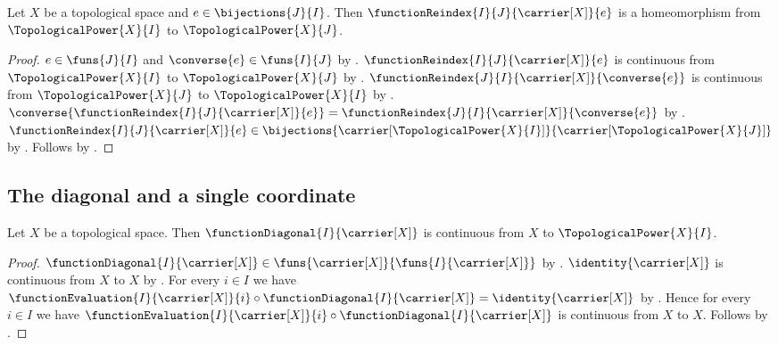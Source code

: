 \begin{theorem}\label{topological_power_reindex_homeomorphism}
    Let $X$ be a topological space and $e\in\bijections{J}{I}$.
    Then $\functionReindex{I}{J}{\carrier[X]}{e}$ is a homeomorphism from
        $\TopologicalPower{X}{I}$ to $\TopologicalPower{X}{J}$.
\end{theorem}
\begin{proof}
    $e\in\funs{J}{I}$ and $\converse{e}\in\funs{I}{J}$ by
        .
    $\functionReindex{I}{J}{\carrier[X]}{e}$ is continuous from
        $\TopologicalPower{X}{I}$ to $\TopologicalPower{X}{J}$ by
        .
    $\functionReindex{J}{I}{\carrier[X]}{\converse{e}}$ is continuous from
        $\TopologicalPower{X}{J}$ to $\TopologicalPower{X}{I}$ by
        .
    $\converse{\functionReindex{I}{J}{\carrier[X]}{e}}
        =\functionReindex{J}{I}{\carrier[X]}{\converse{e}}$ by
        .
    $\functionReindex{I}{J}{\carrier[X]}{e}\in
        \bijections{\carrier[\TopologicalPower{X}{I}]}{\carrier[\TopologicalPower{X}{J}]}$ by
        .
    Follows by .
\end{proof}

\subsection{The diagonal and a single coordinate}

\begin{theorem}\label{topological_power_diagonal_continuous}
    Let $X$ be a topological space.
    Then $\functionDiagonal{I}{\carrier[X]}$ is continuous from $X$ to
        $\TopologicalPower{X}{I}$.
\end{theorem}
\begin{proof}
    $\functionDiagonal{I}{\carrier[X]}\in\funs{\carrier[X]}{\funs{I}{\carrier[X]}}$
        by .
    $\identity{\carrier[X]}$ is continuous from $X$ to $X$ by
        .
    For every $i\in I$ we have
        $\functionEvaluation{I}{\carrier[X]}{i}\circ\functionDiagonal{I}{\carrier[X]}
            =\identity{\carrier[X]}$ by .
    Hence for every $i\in I$ we have
        $\functionEvaluation{I}{\carrier[X]}{i}\circ\functionDiagonal{I}{\carrier[X]}$
            is continuous from $X$ to $X$.
    Follows by .
\end{proof}

